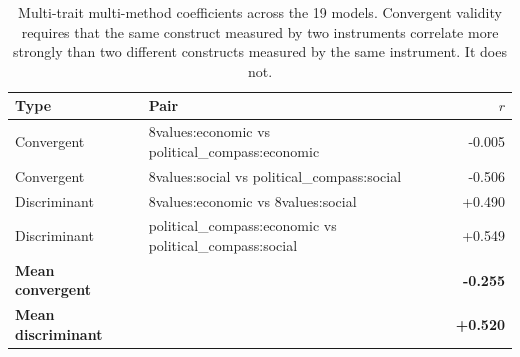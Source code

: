 \documentclass[11pt]{article}
\begin{document}
\begin{table}[H]
\centering
\caption{Multi-trait multi-method coefficients across the 19 models. Convergent validity requires that the same construct measured by two instruments correlate more strongly than two different constructs measured by the same instrument. It does not.}
\label{stab:mtmm}
\begin{tabular}{llr}
\toprule
Type & Pair & $r$ \\
\midrule
Convergent & 8values:economic vs political\_compass:economic & -0.005 \\
Convergent & 8values:social vs political\_compass:social & -0.506 \\
Discriminant & 8values:economic vs 8values:social & +0.490 \\
Discriminant & political\_compass:economic vs political\_compass:social & +0.549 \\
\midrule
\textbf{Mean convergent} & & \textbf{-0.255} \\
\textbf{Mean discriminant} & & \textbf{+0.520} \\
\bottomrule
\end{tabular}
\end{table}



\end{document}
